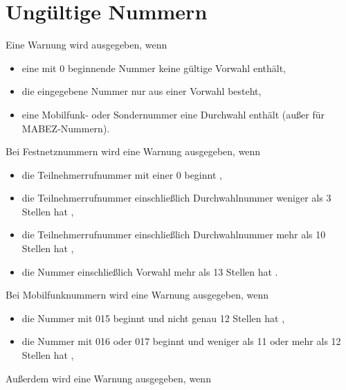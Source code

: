 \documentclass[numbers=noenddot]{scrreprt}
\newcommand\UeberschriftUngueltig{\section{Ungültige Nummern}}
\newcommand\WarnungWenn{Eine Warnung wird ausgegeben, wenn}
\begin{document}
\UeberschriftUngueltig
\WarnungWenn
\begin{itemize}
\item eine mit 0 beginnende Nummer keine gültige Vorwahl enthält,
\item die eingegebene Nummer nur aus einer Vorwahl besteht,
\item eine Mobilfunk- oder Sondernummer eine Durchwahl enthält (außer für MABEZ-Nummern).
\end{itemize}
Bei Festnetznummern wird eine Warnung ausgegeben, wenn
\begin{itemize}
\item die Teilnehmerrufnummer mit einer 0 beginnt \cite[6]{BNA-nummernplan},
\item die Teilnehmerrufnummer einschließlich Durchwahlnummer weniger als 3 Stellen hat \cite[6]{BNA-nummernplan},
\item die Teilnehmerrufnummer einschließlich Durchwahlnummer mehr als 10 Stellen hat \cite[2]{BNA-Struktur},
\item die Nummer einschließlich Vorwahl mehr als 13 Stellen hat \cite[2]{BNA-Struktur}.
\end{itemize}
Bei Mobilfunknummern wird eine Warnung ausgegeben, wenn
\begin{itemize}
\item die Nummer mit 015 beginnt und nicht genau 12 Stellen hat \cite[49\psq]{BNA-konzept},
\item die Nummer mit 016 oder 017 beginnt und weniger als 11 oder mehr als 12 Stellen hat \cite[50]{BNA-konzept},
\end{itemize}
Außerdem wird eine Warnung ausgegeben, wenn
\end{document}
